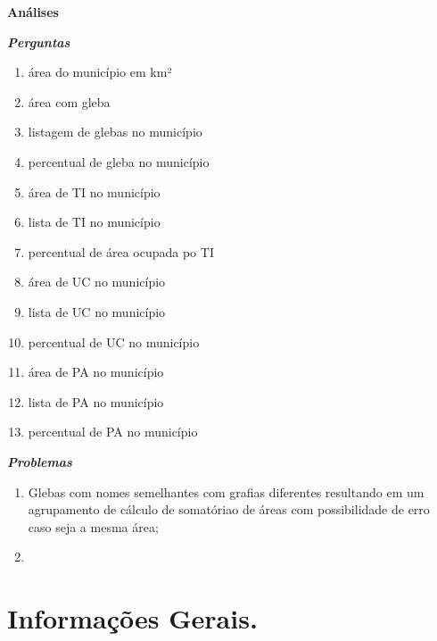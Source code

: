 \documentclass[
  letterpaper,
]{report}
\providecommand{\tightlist}{%
  \setlength{\itemsep}{0pt}\setlength{\parskip}{0pt}}\usepackage{longtable,booktabs,array}
\begin{document}
\begin{tcolorbox}[enhanced jigsaw, opacityback=0, title=\textcolor{quarto-callout-note-color}{\faInfo}\hspace{0.5em}{Note}, bottomrule=.15mm, bottomtitle=1mm, coltitle=black, leftrule=.75mm, toprule=.15mm, colframe=quarto-callout-note-color-frame, colback=white, toptitle=1mm, left=2mm, titlerule=0mm, arc=.35mm, colbacktitle=quarto-callout-note-color!10!white, rightrule=.15mm, opacitybacktitle=0.6, breakable]

\textbf{Análises}

\textbf{\emph{Perguntas}}

\begin{enumerate}
\def\labelenumi{\arabic{enumi}.}
\tightlist
\item
  área do município em km²
\item
  área com gleba
\item
  listagem de glebas no município
\item
  percentual de gleba no município
\item
  área de TI no município
\item
  lista de TI no município
\item
  percentual de área ocupada po TI
\item
  área de UC no município
\item
  lista de UC no município
\item
  percentual de UC no município
\item
  área de PA no município
\item
  lista de PA no município
\item
  percentual de PA no município
\end{enumerate}

\textbf{\emph{Problemas}}

\begin{enumerate}
\def\labelenumi{\arabic{enumi}.}
\tightlist
\item
  Glebas com nomes semelhantes com grafias diferentes resultando em um
  agrupamento de cálculo de somatóriao de áreas com possibilidade de
  erro caso seja a mesma área;
\item
\end{enumerate}

\end{tcolorbox}

\hypertarget{informauxe7uxf5es-gerais.-2}{%
\section{Informações Gerais.}\label{informauxe7uxf5es-gerais.-2}}
\end{document}
